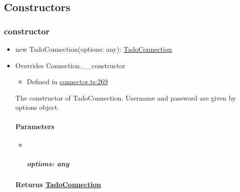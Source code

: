 \documentclass[]{article}
\providecommand{\tightlist}{%
  \setlength{\itemsep}{0pt}\setlength{\parskip}{0pt}}
\let\oldparagraph\paragraph
\renewcommand{\paragraph}[1]{\oldparagraph{#1}\mbox{}}
\let\oldsubparagraph\subparagraph
\renewcommand{\subparagraph}[1]{\oldsubparagraph{#1}\mbox{}}
\begin{document}
\hypertarget{constructors-1}{%
\subsection{Constructors}\label{constructors-1}}

\protect\hypertarget{constructor}{}{}

\hypertarget{constructor}{%
\subsubsection{constructor}\label{constructor}}

\begin{itemize}
\tightlist
\item
  new TadoConnection{(}options{: }{any}{)}{:
  }\href{_connector_.tadoconnection.html}{TadoConnection}
\end{itemize}

\begin{itemize}
\item
  Overrides Connection.\_\_constructor

  \begin{itemize}
  \tightlist
  \item
    Defined in
    \href{https://github.com/BFMBFramework/TadoConnector/blob/f05932b/src/connector.ts\#L269}{connector.ts:269}
  \end{itemize}

  The constructor of TadoConnection. Username and password are given by
  options object.

  \hypertarget{parameters}{%
  \paragraph{Parameters}\label{parameters}}

  \begin{itemize}
  \item ~
    \hypertarget{options-any}{%
    \subparagraph{\texorpdfstring{options:
    {any}}{options: any}}\label{options-any}}
  \end{itemize}

  \hypertarget{returns-tadoconnection}{%
  \paragraph{\texorpdfstring{Returns
  \href{_connector_.tadoconnection.html}{TadoConnection}}{Returns TadoConnection}}\label{returns-tadoconnection}}
\end{itemize}
\end{document}
